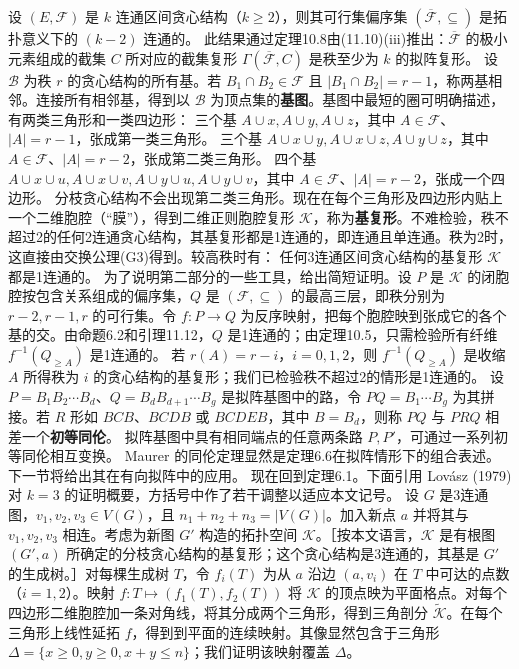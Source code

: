 设 $(E,\mathcal F)$ 是 $k$ 连通区间贪心结构（$k\ge2$），则其可行集偏序集 $(\overline{\mathcal F},\subseteq)$ 是拓扑意义下的 $(k-2)$ 连通的。
此结果通过定理10.8由(11.10)(iii)推出：$\overline{\mathcal F}$ 的极小元素组成的截集 $C$ 所对应的截集复形 $\Gamma(\overline{\mathcal F},C)$ 是秩至少为 $k$ 的拟阵复形。
设 $\mathcal B$ 为秩 $r$ 的贪心结构的所有基。若 $B_1\cap B_2\in\mathcal F$ 且 $|B_1\cap B_2|=r-1$，称两基相邻。连接所有相邻基，得到以 $\mathcal B$ 为顶点集的\textbf{基图}。基图中最短的圈可明确描述，有两类三角形和一类四边形：
三个基 $A\cup x,A\cup y,A\cup z$，其中 $A\in\mathcal F$、$|A|=r-1$，张成第一类三角形。
三个基 $A\cup x\cup y,A\cup x\cup z,A\cup y\cup z$，其中 $A\in\mathcal F$、$|A|=r-2$，张成第二类三角形。
四个基 $A\cup x\cup u,A\cup x\cup v,A\cup y\cup u,A\cup y\cup v$，其中 $A\in\mathcal F$、$|A|=r-2$，张成一个四边形。
分枝贪心结构不会出现第二类三角形。现在在每个三角形及四边形内贴上一个二维胞腔（“膜”），得到二维正则胞腔复形 $\mathcal K$，称为\textbf{基复形}。不难检验，秩不超过2的任何2连通贪心结构，其基复形都是1连通的，即连通且单连通。秩为2时，这直接由交换公理(G3)得到。较高秩时有：
任何3连通区间贪心结构的基复形 $\mathcal K$ 都是1连通的。
为了说明第二部分的一些工具，给出简短证明。设 $P$ 是 $\mathcal K$ 的闭胞腔按包含关系组成的偏序集，$Q$ 是 $(\mathcal F,\subseteq)$ 的最高三层，即秩分别为 $r-2,r-1,r$ 的可行集。令 $f:P\to Q$ 为反序映射，把每个胞腔映到张成它的各个基的交。由命题6.2和引理11.12，$Q$ 是1连通的；由定理10.5，只需检验所有纤维 $f^{-1}(Q_{\ge A})$ 是1连通的。
若 $r(A)=r-i$，$i=0,1,2$，则 $f^{-1}(Q_{\ge A})$ 是收缩 $A$ 所得秩为 $i$ 的贪心结构的基复形；我们已检验秩不超过2的情形是1连通的。
设 $P=B_1B_2\cdots B_d$、$Q=B_dB_{d+1}\cdots B_g$ 是拟阵基图中的路，令 $PQ=B_1\cdots B_g$ 为其拼接。若 $R$ 形如 $BCB$、$BCDB$ 或 $BCDEB$，其中 $B=B_d$，则称 $PQ$ 与 $PRQ$ 相差一个\textbf{初等同伦}。
拟阵基图中具有相同端点的任意两条路 $P,P'$，可通过一系列初等同伦相互变换。
Maurer 的同伦定理显然是定理6.6在拟阵情形下的组合表述。下一节将给出其在有向拟阵中的应用。
现在回到定理6.1。下面引用 Lovász (1979) 对 $k=3$ 的证明概要，方括号中作了若干调整以适应本文记号。
设 $G$ 是3连通图，$v_1,v_2,v_3\in V(G)$，且 $n_1+n_2+n_3=|V(G)|$。加入新点 $a$ 并将其与 $v_1,v_2,v_3$ 相连。考虑为新图 $G'$ 构造的拓扑空间 $\mathcal K$。［按本文语言，$\mathcal K$ 是有根图 $(G',a)$ 所确定的分枝贪心结构的基复形；这个贪心结构是3连通的，其基是 $G'$ 的生成树。］对每棵生成树 $T$，令 $f_i(T)$ 为从 $a$ 沿边 $(a,v_i)$ 在 $T$ 中可达的点数（$i=1,2$）。映射 $f:T\mapsto(f_1(T),f_2(T))$ 将 $\mathcal K$ 的顶点映为平面格点。对每个四边形二维胞腔加一条对角线，将其分成两个三角形，得到三角剖分 $\widetilde{\mathcal K}$。在每个三角形上线性延拓 $f$，得到到平面的连续映射。其像显然包含于三角形 $\Delta=\{x\ge0,y\ge0,x+y\le n\}$；我们证明该映射覆盖 $\Delta$。
